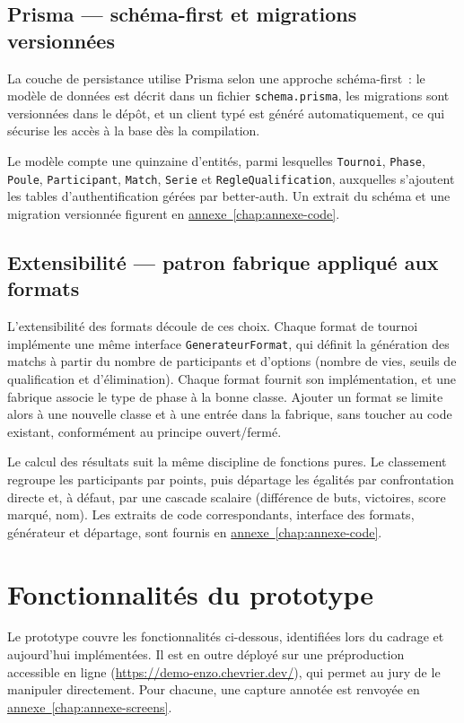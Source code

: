 \subsection{Prisma --- schéma-first et migrations versionnées}
La couche de persistance utilise Prisma selon une approche schéma-first~: le modèle de données est décrit dans un fichier \texttt{schema.prisma}, les migrations sont versionnées dans le dépôt, et un client typé est généré automatiquement, ce qui sécurise les accès à la base dès la compilation.

Le modèle compte une quinzaine d'entités, parmi lesquelles \texttt{Tournoi}, \texttt{Phase}, \texttt{Poule}, \texttt{Participant}, \texttt{Match}, \texttt{Serie} et \texttt{RegleQualification}, auxquelles s'ajoutent les tables d'authentification gérées par better-auth. Un extrait du schéma et une migration versionnée figurent en \hyperref[ann:prisma]{annexe~\ref*{chap:annexe-code}}.

\subsection{Extensibilité --- patron fabrique appliqué aux formats}
L'extensibilité des formats découle de ces choix. Chaque format de tournoi implémente une même interface \texttt{GenerateurFormat}, qui définit la génération des matchs à partir du nombre de participants et d'options (nombre de vies, seuils de qualification et d'élimination). Chaque format fournit son implémentation, et une fabrique associe le type de phase à la bonne classe. Ajouter un format se limite alors à une nouvelle classe et à une entrée dans la fabrique, sans toucher au code existant, conformément au principe ouvert/fermé.

Le calcul des résultats suit la même discipline de fonctions pures. Le classement regroupe les participants par points, puis départage les égalités par confrontation directe et, à défaut, par une cascade scalaire (différence de buts, victoires, score marqué, nom). Les extraits de code correspondants, interface des formats, générateur et départage, sont fournis en \hyperref[ann:code-metier]{annexe~\ref*{chap:annexe-code}}.

\section{Fonctionnalités du prototype}\label{sec:fonctionnalites}
Le prototype couvre les fonctionnalités ci-dessous, identifiées lors du cadrage et aujourd'hui implémentées. Il est en outre déployé sur une préproduction accessible en ligne (\url{https://demo-enzo.chevrier.dev/}), qui permet au jury de le manipuler directement. Pour chacune, une capture annotée est renvoyée en \hyperref[chap:annexe-screens]{annexe~\ref*{chap:annexe-screens}}.

